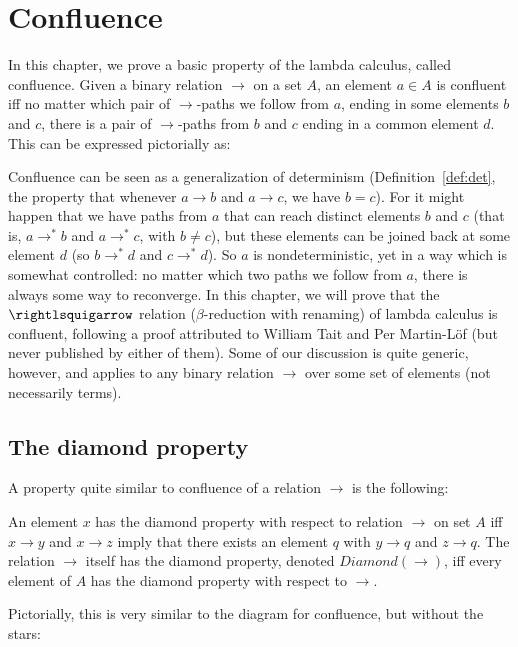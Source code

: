 \chapter{Confluence}

In this chapter, we prove a basic property of the lambda calculus,
called confluence. Given a binary relation $\to$ on
a set $A$, an element $a \in A$ is confluent iff no matter which pair
of $\to$-paths we follow from $a$, ending in some elements $b$ and
$c$, there is a pair of $\to$-paths from $b$ and $c$ ending in a
common element $d$.  This can be expressed pictorially as:

\begin{center}
\end{center}

Confluence can be seen as a generalization of determinism
(Definition~\ref{def:det}, the property that whenever $a \to b$ and $a
\to c$, we have $b = c$).  For it might happen that we have paths from
$a$ that can reach distinct elements $b$ and $c$ (that is, $a \to^* b$
and $a \to^* c$, with $b \neq c$), but these elements can be joined
back at some element $d$ (so $b \to^*d$ and $c\to^*d$).  So $a$ is
nondeterministic, yet in a way which is somewhat controlled: no matter
which two paths we follow from $a$, there is always some way to
reconverge.  In this chapter, we will prove that the $\betaa$
relation ($\beta$-reduction with renaming) of lambda calculus is
confluent, following a proof attributed to William Tait and Per
Martin-L\"of (but never published by either of them).  Some of our
discussion is quite generic, however, and applies to any binary
relation $\to$ over some set of elements (not necessarily terms).

\section{The diamond property}

A property quite similar to confluence of a relation $\to$ is
the following:
\begin{definition}
  An element $x$ has the diamond property with respect to relation
  $\to$ on set $A$ iff $x \to y$ and $x \to z$ imply that there exists an element $q$
  with $y \to q$ and $z \to q$. The relation $\to$ itself has the diamond
  property, denoted $\textit{Diamond}(\to)$, iff every element of $A$ has
  the diamond property with respect to $\to$.  
  \end{definition}
\noindent Pictorially, this is very similar to the diagram for confluence,
but without the stars:

